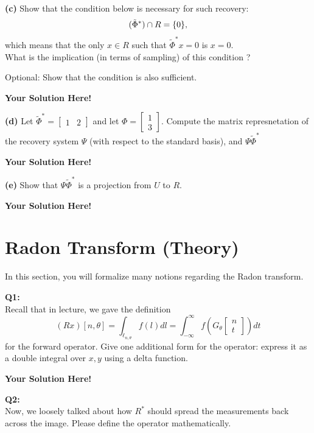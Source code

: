 \documentclass[12pt]{article}
\newcommand{\0}{\mathbf{0}}
\newcommand{\1}{\mathbf{1}}
\newcommand{\solspace}{\vspace{3mm} \textbf{Your Solution Here!} \vspace{3mm}}
\begin{document}
\textbf{(c)} Show that the condition below is necessary for such recovery:
\begin{equation}
    \null(\tilde \Phi^*) \cap R = \{0\},
\end{equation}
which means that the only $x \in R$ such that $\tilde \Phi^* x = 0$ is $x=0$.\\
What is the implication (in terms of sampling) of this condition ?

Optional: Show that the condition is also sufficient.

\solspace

\textbf{(d)} Let $\tilde \Phi^* = \begin{bmatrix}
    1 & 2
\end{bmatrix}$ and let $\Phi = \begin{bmatrix}
    1 \\ 3
\end{bmatrix}$. Compute the matrix represnetation of the recovery system $\Psi$ (with respect to the standard basis), and $\Psi \tilde \Phi^*$

\solspace

\textbf{(e)} Show that $\Psi \tilde \Phi^*$ is a projection from $U$ to $R$.

\solspace

\pagebreak

\section{Radon Transform (Theory)}
In this section, you will formalize many notions regarding the Radon transform.

\textbf{Q1:}\\
Recall that in lecture, we gave the definition 
\begin{equation}
	(Rx)[n,\theta] = \int_{\ell_{n,\theta}}f(l) dl = \int_{-\infty}^{\infty}f\left(G_\theta\begin{bmatrix}
		n \\ t
	\end{bmatrix}\right) dt
\end{equation}
for the forward operator.
Give one additional form for the operator: express it as a double integral over $x,y$ using a delta function.

\solspace

\textbf{Q2:}\\
Now, we loosely talked about how $R^*$ should spread the measurements back across the image.
Please define the operator mathematically.
\end{document}
